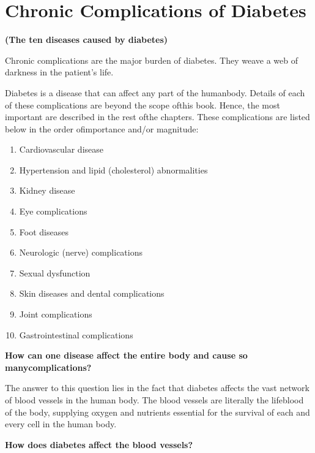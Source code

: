 \newpage

\chapter{Chronic Complications of Diabetes}\label{chap11}

\vspace{-\topsep}
\centerline{\Large{\textbf{(The ten diseases caused by diabetes)}}}

\vskip 8pt
Chronic complications are the major burden of diabetes. They weave a web of darkness in the patient’s life.

Diabetes is a disease that can affect any part of the human\break body. Details of each of these complications are beyond the scope of\break this book. Hence, the most important are described in the rest of\break the chapters. These complications are listed below in the order of\break importance and/or magnitude:

\vspace{-\topsep}
\begin{enumerate}
\itemsep=0pt
\item Cardiovascular disease
\item Hypertension and lipid (cholesterol) abnormalities
\item Kidney disease
\item Eye complications
\item Foot diseases
\item Neurologic (nerve) complications
\item Sexual dysfunction
\item Skin diseases and dental complications
\item Joint complications
\item Gastrointestinal complications
\end{enumerate}
\vspace{-\topsep}

\noindent\textbf{How can one disease affect the entire body and cause so many\break complications?}

The answer to this question lies in the fact that diabetes affects the vast network of blood vessels in the human body. The blood vessels are literally the lifeblood of the body, supplying oxygen and nutrients essential for the survival of each and every cell in the human body.

\vskip 3pt
\noindent\textbf{How does diabetes affect the blood vessels?}
\vskip 3pt

